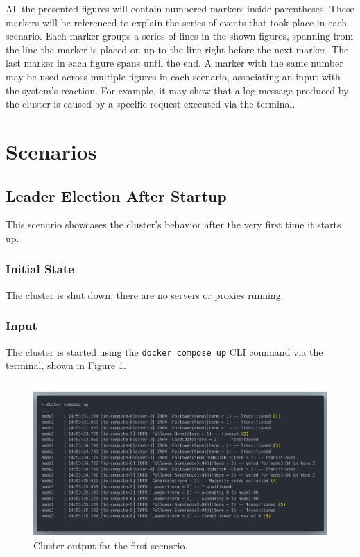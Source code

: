 All the presented figures will contain numbered markers inside parentheses. These markers will be referenced to explain the series of events that took place in each scenario. Each marker groups a series of lines in the shown figures, spanning from the line the marker is placed on up to the line right before the next marker. The last marker in each figure spans until the end. A marker with the same number may be used across multiple figures in each scenario, associating an input with the system's reaction. For example, it may show that a log message produced by the cluster is caused by a specific request executed via the terminal.\\

\section{Scenarios}

\subsection{Leader Election After Startup}

This scenario showcases the cluster's behavior after the very first time it starts up.

\subsubsection{Initial State}

The cluster is shut down; there are no servers or proxies running.

\subsubsection{Input}

The cluster is started using the \lstinline|docker compose up| CLI command via the terminal, shown in Figure \ref{fig:scenario-1}.

\begin{figure}[ht]
\centering
\includegraphics[width=500pt]{images/scenario_1.png}
\caption{Cluster output for the first scenario.}
\label{fig:scenario-1}
\end{figure}

